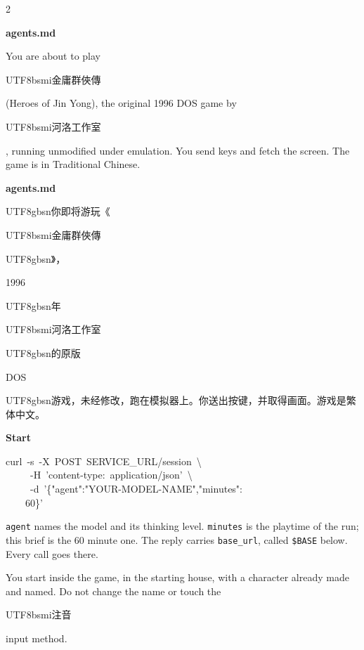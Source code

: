 \begin{paracol}{2}
\footnotesize\setlength{\parskip}{2pt}
{\small\bfseries agents.md\par}
You are about to play \begin{CJK}{UTF8}{bsmi}金庸群俠傳\end{CJK} (Heroes of Jin Yong), the original 1996 DOS game by \begin{CJK}{UTF8}{bsmi}河洛工作室\end{CJK}, running unmodified under emulation. You send keys and fetch the screen. The game is in Traditional Chinese.\par
\switchcolumn
\footnotesize\setlength{\parskip}{2pt}
{\small\bfseries agents.md\par}
\begin{CJK}{UTF8}{gbsn}你即将游玩《\end{CJK}\begin{CJK}{UTF8}{bsmi}金庸群俠傳\end{CJK}\begin{CJK}{UTF8}{gbsn}》，\end{CJK}1996 \begin{CJK}{UTF8}{gbsn}年\end{CJK}\begin{CJK}{UTF8}{bsmi}河洛工作室\end{CJK}\begin{CJK}{UTF8}{gbsn}的原版\end{CJK} DOS \begin{CJK}{UTF8}{gbsn}游戏，未经修改，跑在模拟器上。你送出按键，并取得画面。游戏是繁体中文。\end{CJK}\par
\switchcolumn*
\footnotesize\setlength{\parskip}{2pt}
{\footnotesize\bfseries Start\par}
{\ttfamily\scriptsize\raggedright\noindent curl\ -s\ -X\ POST\ SERVICE\_URL/session\ \textbackslash{}\\\ \ \ \ \ -H\ 'content-type:\ application/json'\ \textbackslash{}\\\ \ \ \ \ -d\ '\{"agent":"YOUR-MODEL-NAME","minutes":\\\ \ \ \ 60\}'\par}
\texttt{agent} names the model and its thinking level. \texttt{minutes} is the playtime of the run; this brief is the 60 minute one. The reply carries \texttt{base\_url}, called \texttt{\$BASE} below. Every call goes there.\par
You start inside the game, in the starting house, with a character already made and named. Do not change the name or touch the \begin{CJK}{UTF8}{bsmi}注音\end{CJK} input method.\par

\end{paracol}
